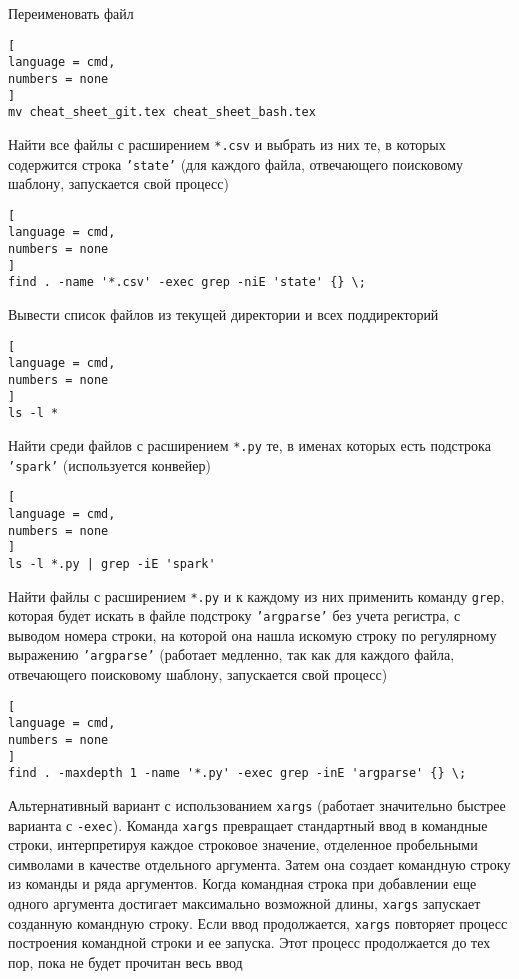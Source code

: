\documentclass[%
	11pt,
	a4paper,
	utf8,
		]{article}
\begin{document}
Переименовать файл

\begin{lstlisting}[
language = cmd,
numbers = none
]
mv cheat_sheet_git.tex cheat_sheet_bash.tex
\end{lstlisting}

Найти все файлы с расширением \texttt{*.csv} и выбрать из них те, в которых содержится строка \texttt{'state'} (для каждого файла, отвечающего поисковому шаблону, запускается свой процесс)

\begin{lstlisting}[
language = cmd,
numbers = none
]
find . -name '*.csv' -exec grep -niE 'state' {} \;
\end{lstlisting}

Вывести список файлов из текущей директории и всех поддиректорий

\begin{lstlisting}[
language = cmd,
numbers = none
]
ls -l *
\end{lstlisting}

Найти среди файлов с расширением \texttt{*.py} те, в именах которых есть подстрока \texttt{'spark'} (используется конвейер)

\begin{lstlisting}[
language = cmd,
numbers = none
]
ls -l *.py | grep -iE 'spark'
\end{lstlisting}

Найти файлы с расширением \texttt{*.py} и к каждому из них применить команду \texttt{grep}, которая будет искать в файле подстроку \texttt{'argparse'} без учета регистра, с выводом номера строки, на которой она нашла искомую строку по регулярному выражению \texttt{'argparse'} (работает {\color{deepred} медленно}, так как для каждого файла, отвечающего поисковому шаблону, запускается свой процесс)

\begin{lstlisting}[
language = cmd,
numbers = none
]
find . -maxdepth 1 -name '*.py' -exec grep -inE 'argparse' {} \;
\end{lstlisting}

Альтернативный вариант с использованием \texttt{xargs} (работает значительно быстрее варианта с \texttt{-exec}). Команда \texttt{xargs} превращает стандартный ввод в командные строки, интерпретируя каждое строковое значение, отделенное пробельными символами в качестве отдельного аргумента. Затем она создает командную строку из команды и ряда аргументов. Когда командная строка при добавлении еще одного аргумента достигает максимально возможной длины, \texttt{xargs} запускает созданную командную строку. Если ввод продолжается, \texttt{xargs} повторяет процесс построения командной строки и ее запуска. Этот процесс продолжается до тех пор, пока не будет прочитан весь ввод
\end{document}
